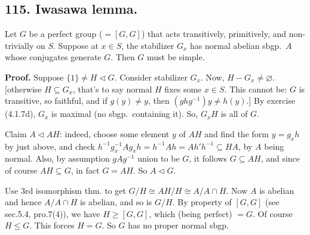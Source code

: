 \documentclass[12pt]{article}
\newcommand{\Ss}[1]{\textsf{\textbf{#1}}}%
\begin{document}
\subsection*{115. Iwasawa lemma.} Let \(G\) be a perfect group (\(=[G,G]\)) that acts transitively, primitively, and non-trivially on \(S\). 
Suppose at \(x \in S\), the stabilizer \(G_x\) has normal abelian sbgp.\ \(A\) whose conjugates generate \(G\). 
Then \(G\) must be simple. \par
\Ss{Proof.} Suppose \(\{1\} \neq H \lhd G\). 
Consider stabilizer \(G_x\). 
Now, \(H - G_x \neq \varnothing\). [otherwise \(H \subseteq G_x\), that's to say normal \(H\) fixes some \(x \in S\). This cannot be: \(G\) is transitive, so faithful, and if \(g(y) \neq y\), then \((ghg^{-1})y \neq h(y)\).] 
By exercise (4.1.7d), \(G_x\) is maximal (no sbgp.\ containing it). 
So, \(G_x H\) is all of \(G\). \par
Claim \(A \lhd AH\): indeed, choose some element \(y\) of \(AH\) and find the form \(y= g_x h\) by just above, 
and check \(h^{-1} g_x^{-1} A g_x h = h^{-1} A h = Ah'h^{-1} \subseteq HA\), by \(A\) being normal. 
Also, by assumption \(gAg^{-1}\) union to be \(G\), 
it follows \(G \subseteq AH\), 
and since of course \(AH \subseteq G\), in fact \(G = AH\). 
So \(A \lhd G\). \par
Use 3rd isomorphism thm. to get \(G/H \cong AH/H \cong A / A \cap H\). 
Now \(A\) is abelian and hence \(A / A \cap H\) is abelian, and so is \(G/H\). 
By property of \([G,G]\) (see sec.5.4, pro.7(4)), we have \(H \geq [G,G]\), which (being perfect) \(= G\). 
Of course \(H \leq G\). 
This forces \(H=G\). 
So \(G\) has no proper normal sbgp. 
\end{document}
